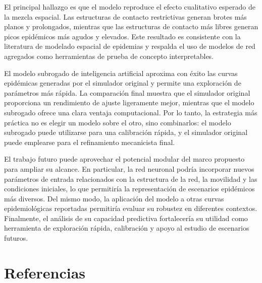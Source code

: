 \documentclass[12pt,a4paper,twocolumn]{article}
\begin{document}
El principal hallazgo es que el modelo reproduce el efecto cualitativo esperado de la mezcla espacial. Las estructuras de contacto restrictivas generan brotes más planos y prolongados, mientras que las estructuras de contacto más libres generan picos epidémicos más agudos y elevados. Este resultado es consistente con la literatura de modelado espacial de epidemias y respalda el uso de modelos de red agregados como herramientas de prueba de concepto interpretables.

El modelo subrogado de inteligencia artificial aproxima con éxito las curvas epidémicas generadas por el simulador original y permite una exploración de parámetros más rápida. La comparación final muestra que el simulador original proporciona un rendimiento de ajuste ligeramente mejor, mientras que el modelo subrogado ofrece una clara ventaja computacional. Por lo tanto, la estrategia más práctica no es elegir un modelo sobre el otro, sino combinarlos: el modelo subrogado puede utilizarse para una calibración rápida, y el simulador original puede emplearse para el refinamiento mecanicista final.

El trabajo futuro puede aprovechar el potencial modular del marco propuesto para ampliar su alcance. En particular, la red neuronal podría incorporar nuevos parámetros de entrada relacionados con la estructura de la red, la movilidad y las condiciones iniciales, lo que permitiría la representación de escenarios epidémicos más diversos. Del mismo modo, la aplicación del modelo a otras curvas epidemiológicas reportadas permitiría evaluar su robustez en diferentes contextos. Finalmente, el análisis de su capacidad predictiva fortalecería su utilidad como herramienta de exploración rápida, calibración y apoyo al estudio de escenarios futuros.


\section*{Referencias}
\end{document}
